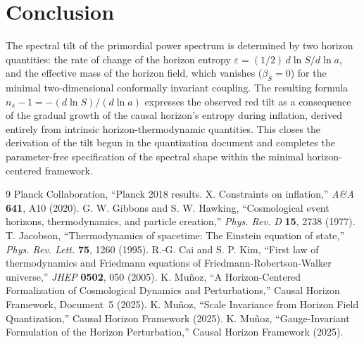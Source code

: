\documentclass[12pt,a4paper]{article}
\begin{document}
\section{Conclusion}

The spectral tilt of the primordial power spectrum is determined by two horizon quantities: the rate of change of the horizon entropy $\varepsilon = (1/2)\, d\ln S/d\ln a$, and the effective mass of the horizon field, which vanishes ($\beta_S = 0$) for the minimal two-dimensional conformally invariant coupling. The resulting formula $n_s - 1 = -(d\ln S)/(d\ln a)$ expresses the observed red tilt as a consequence of the gradual growth of the causal horizon's entropy during inflation, derived entirely from intrinsic horizon-thermodynamic quantities. This closes the derivation of the tilt begun in the quantization document and completes the parameter-free specification of the spectral shape within the minimal horizon-centered framework.

\begin{thebibliography}{9}
 Planck Collaboration, ``Planck 2018 results. X. Constraints on inflation,'' \textit{A\&A} \textbf{641}, A10 (2020).
 G. W. Gibbons and S. W. Hawking, ``Cosmological event horizons, thermodynamics, and particle creation,'' \textit{Phys. Rev. D} \textbf{15}, 2738 (1977).
 T. Jacobson, ``Thermodynamics of spacetime: The Einstein equation of state,'' \textit{Phys. Rev. Lett.} \textbf{75}, 1260 (1995).
 R.-G. Cai and S. P. Kim, ``First law of thermodynamics and Friedmann equations of Friedmann-Robertson-Walker universe,'' \textit{JHEP} \textbf{0502}, 050 (2005).
 K. Mu\~noz, ``A Horizon-Centered Formalization of Cosmological Dynamics and Perturbations,'' Causal Horizon Framework, Document~5 (2025).
 K. Mu\~noz, ``Scale Invariance from Horizon Field Quantization,'' Causal Horizon Framework (2025).
 K. Mu\~noz, ``Gauge-Invariant Formulation of the Horizon Perturbation,'' Causal Horizon Framework (2025).
\end{thebibliography}
\end{document}
